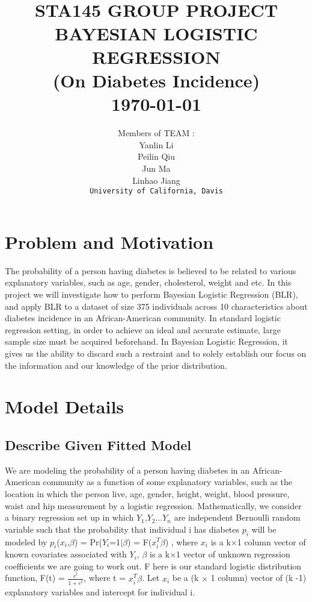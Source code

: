 \documentclass[paper=letterpaper,fontsize=12pt,twoside,american]{scrartcl}
\title{	\normalsize \textsc{}\\[2.0cm]								%
			\HRule{5pt} \\						%
			\LARGE \textbf{
			\uppercase{
			STA145 Group Project
			\\Bayesian Logistic Regression
			}
			\\(On Diabetes Incidence)
			}	%
			\HRule{5pt} \\ [2.0cm]	
			\normalsize \today			%
		}
\author{ Members of TEAM : 
		\\ Yanlin Li 
		\\ Peilin Qiu 
		\\ Jun Ma 
		\\ Linhao Jiang 
     \\ \texttt{University of California, Davis} \\
}
\makeatletter
\def\printtitle{						
    {\centering \@title\par}}
\def\printauthor{%
    {\centering\Large\@author}}
\makeatother
\begin{document}
\thispagestyle{empty}		
\printtitle			
\vfill
\printauthor
\newpage
\setcounter{page}{1}	

\section{Problem and Motivation}
The probability of a person having diabetes is believed to be related to various explanatory variables, such as age, gender, cholesterol, weight and etc. In this project we will investigate how to perform Bayesian Logistic Regression (BLR), and apply BLR to a dataset of size 375 individuals across 10 characteristics about diabetes incidence in an African-American community. In standard logistic regression setting, in order to achieve an ideal and accurate estimate, large sample size must be acquired beforehand. In Bayesian Logistic Regression, it gives us the ability to discard such a restraint and to solely establish our focus on the information and our knowledge of the prior distribution.

\section{Model Details}

\subsection{Describe Given Fitted Model}   
We are modeling the probability of a person having diabetes in an African-American community as a function of some explanatory variables, such as the location in which the person live, age, gender, height, weight, blood pressure, waist and hip measurement by a logistic regression. Mathematically, we consider a binary regression set up in which $Y_{1}$,$Y_{2}$...$Y_{n}$ are independent Bernoulli random variable such that the probability that individual i has diabetes $p_{i}$ will be modeled by $p_{i}$($x_{i}$,$\beta$)  = Pr($Y_{i}$=1$|$$\beta$)  = F($x_{i}^{T}$$\beta$) , where $x_{i}$ is a k$\times$1 column vector of known covariates associated with $Y_{i}$, $\beta$ is a k$\times$1 vector of unknown regression coefficients we are going to work out. F here is our standard logistic distribution function, F(t) = $\frac{e^{t}}{1+e^{t}}$, where t = $x_{i}^{T}\beta$. Let $x_{i}$ be a (k $\times$ 1 column) vector of (k -1) explanatory variables and intercept for individual i.
\end{document}
